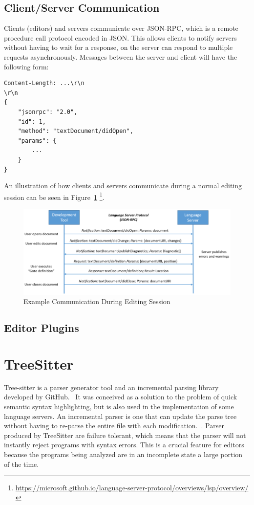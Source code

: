 \documentclass[../thesis.tex]{subfiles}
\begin{document}
\subsection{Client/Server Communication}%
\label{sub:client_server_communication}
Clients (editors) and servers communicate over JSON-RPC, which is a remote procedure call protocol encoded in JSON.
This allows clients to notify servers without having to wait for a response, on the server can respond to multiple requests asynchronously.
Messages between the server and client will have the following form:
\begin{Verbatim}
Content-Length: ...\r\n
\r\n
{
	"jsonrpc": "2.0",
	"id": 1,
	"method": "textDocument/didOpen",
	"params": {
		...
	}
}
\end{Verbatim}
An illustration of how clients and servers communicate during a normal editing session can be seen in Figure~\ref{fig:lsp-communication}
\footnote{\url{https://microsoft.github.io/language-server-protocol/overviews/lsp/overview/}}.
\begin{figure}[htpb]
    \centering
    \includegraphics[width=1\linewidth]{images/lsp-communication.png}
    \caption{Example Communication During Editing Session}%
    \label{fig:lsp-communication}
\end{figure}

\subsection{Editor Plugins}%
\label{sub:editor_plugins}




\section{TreeSitter}
Tree-sitter is a parser generator tool and an incremental parsing library developed by GitHub.~\parencite{WinNT}
It was conceived as a solution to the problem of quick semantic syntax highlighting,
but is also used in the implementation of some language servers.
An incremental parser is one that can update the parse tree without having to re-parse the entire
file with each modification.~\parencite{incremental}.
Parser produced by TreeSitter are failure tolerant, which means that the parser will not instantly reject
programs with syntax errors.
This is a crucial feature for editors because the programs being analyzed
are in an incomplete state a large portion of the time.
\end{document}

